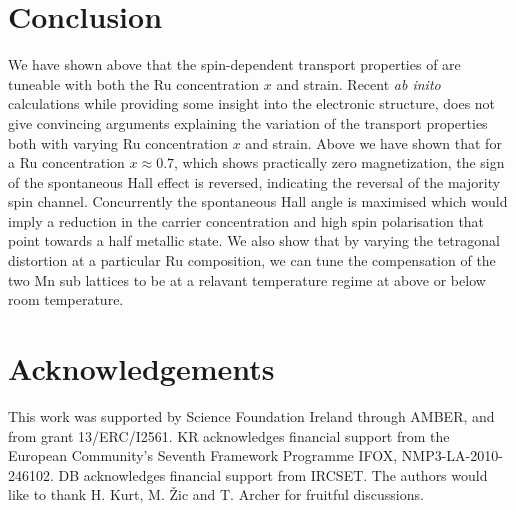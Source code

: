 \documentclass[reprint,aip,apl,floatfix,linenumbers,superscriptaddress]{revtex4-1}
\begin{document}
\section{Conclusion}
\label{sec:conclusion}
We have shown above that the spin-dependent transport properties of  are tuneable with both the Ru concentration $x$ and strain. Recent 
\textit{ab inito} calculations \cite{galanakisJAP2013} while providing some 
insight into the electronic structure, does not give convincing arguments 
explaining the variation of the transport properties both with varying Ru 
concentration $x$ and strain. Above we have shown that for a Ru concentration 
$x\approx\num{0.7}$, which shows practically zero magnetization, the sign of 
the spontaneous Hall effect is reversed, indicating the reversal of the 
majority spin channel. Concurrently the spontaneous Hall angle is maximised 
which would imply a reduction in the carrier concentration and high spin 
polarisation that point towards a half metallic state. We also show that by 
varying the tetragonal distortion at a particular Ru composition, we can tune 
the compensation of the two Mn sub lattices to be at a relavant temperature 
regime at above or below room temperature. 
 
\section{Acknowledgements}
\label{sec:acknowledgements}
This work was supported by Science Foundation Ireland through AMBER, and from 
grant 13/ERC/I2561. KR acknowledges financial support from the
European Community's Seventh Framework Programme IFOX, NMP3-LA-2010-246102. 
DB acknowledges financial support from IRCSET. The authors would like to 
thank H. Kurt, M. \v{Z}ic and T. Archer for fruitful discussions.


\end{document}
